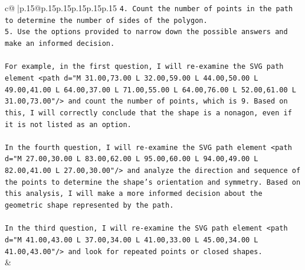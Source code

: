 \documentclass{article}
\begin{document}
{\begin{supertabular}{c@{$\;$}|p{.15\linewidth}@{}p{.15\linewidth}p{.15\linewidth}p{.15\linewidth}p{.15\linewidth}p{.15\linewidth}}
{{{\texttt{4. Count the number of points in the path to determine the number of sides of the polygon.} \\
\texttt{5. Use the options provided to narrow down the possible answers and make an informed decision.} \\
\\ 
\texttt{For example, in the first question, I will re{-}examine the SVG path element <path d="M 31.00,73.00 L 32.00,59.00 L 44.00,50.00 L 49.00,41.00 L 64.00,37.00 L 71.00,55.00 L 64.00,76.00 L 52.00,61.00 L 31.00,73.00"/> and count the number of points, which is 9. Based on this, I will correctly conclude that the shape is a nonagon, even if it is not listed as an option.} \\
\\ 
\texttt{In the fourth question, I will re{-}examine the SVG path element <path d="M 27.00,30.00 L 83.00,62.00 L 95.00,60.00 L 94.00,49.00 L 82.00,41.00 L 27.00,30.00"/> and analyze the direction and sequence of the points to determine the shape's orientation and symmetry. Based on this analysis, I will make a more informed decision about the geometric shape represented by the path.} \\
\\ 
\texttt{In the third question, I will re{-}examine the SVG path element <path d="M 41.00,43.00 L 37.00,34.00 L 41.00,33.00 L 45.00,34.00 L 41.00,43.00"/> and look for repeated points or closed shapes.} \\
            }
        }
    }
    & \\ \\

\end{supertabular}
}
\end{document}
